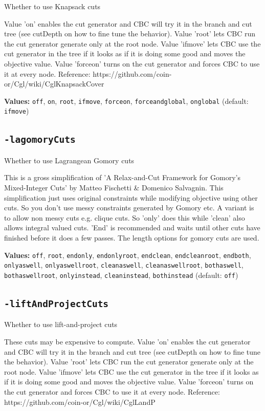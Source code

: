\documentclass[11pt,a4paper]{article}
\begin{document}
Whether to use Knapsack cuts

Value 'on' enables the cut generator and CBC will try it in the branch and cut tree (see cutDepth on how to fine tune the behavior). Value 'root' lets CBC run the cut generator generate only at the root node. Value 'ifmove' lets CBC use the cut generator in the tree if it looks as if it is doing some good and moves the objective value. Value 'forceon' turns on the cut generator and forces CBC to use it at every node.
 Reference: https://github.com/coin-or/Cgl/wiki/CglKnapsackCover

\textbf{Values:} \texttt{off}, \texttt{on}, \texttt{root}, \texttt{ifmove}, \texttt{forceon}, \texttt{forceandglobal}, \texttt{onglobal} (default: \texttt{ifmove})

\subsection*{\texttt{-lagomoryCuts}}

Whether to use Lagrangean Gomory cuts

This is a gross simplification of 'A Relax-and-Cut Framework for Gomory's Mixed-Integer Cuts' by Matteo Fischetti \& Domenico Salvagnin.  This simplification just uses original constraints while modifying objective using other cuts. So you don't use messy constraints generated by Gomory etc. A variant is to allow non messy cuts e.g. clique cuts. So 'only' does this while 'clean' also allows integral valued cuts.  'End' is recommended and waits until other cuts have finished before it does a few passes. The length options for gomory cuts are used.

\textbf{Values:} \texttt{off}, \texttt{root}, \texttt{endonly}, \texttt{endonlyroot}, \texttt{endclean}, \texttt{endcleanroot}, \texttt{endboth}, \texttt{onlyaswell}, \texttt{onlyaswellroot}, \texttt{cleanaswell}, \texttt{cleanaswellroot}, \texttt{bothaswell}, \texttt{bothaswellroot}, \texttt{onlyinstead}, \texttt{cleaninstead}, \texttt{bothinstead} (default: \texttt{off})

\subsection*{\texttt{-liftAndProjectCuts}}

Whether to use lift-and-project cuts

These cuts may be expensive to compute. Value 'on' enables the cut generator and CBC will try it in the branch and cut tree (see cutDepth on how to fine tune the behavior). Value 'root' lets CBC run the cut generator generate only at the root node. Value 'ifmove' lets CBC use the cut generator in the tree if it looks as if it is doing some good and moves the objective value. Value 'forceon' turns on the cut generator and forces CBC to use it at every node.
 Reference: https://github.com/coin-or/Cgl/wiki/CglLandP
\end{document}
